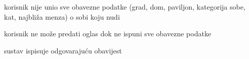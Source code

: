 \begin{packed_item}
\begin{packed_item}
	\item[6.a] korisnik nije unio sve obavezne podatke (grad, dom, paviljon, kategorija sobe, kat, najbliža menza) o sobi koju nudi
	\item[] \begin{packed_enum}
		
		\item korisnik ne može predati oglas dok ne ispuni sve obavezne podatke
		\item sustav ispisuje odgovarajuću obavijest
		
	\end{packed_enum}
	
\end{packed_item}
	
\end{packed_item}




